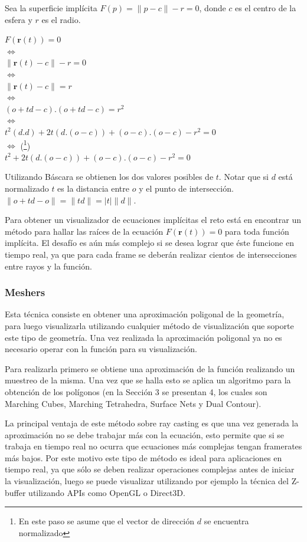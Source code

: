 \documentclass[12pt]{article}
\begin{document}
Sea la superficie implícita $F(p)=\lVert p -c \rVert - r = 0$, donde $c$ es el centro de la esfera y $r$ es el radio.
\begin{center}
$ F(\textbf{r}(t))= 0$
\\$ \iff$
\\$ \lVert \textbf{r}(t) -c \rVert - r = 0$
\\$ \iff$
\\$ \lVert \textbf{r}(t) -c \rVert = r$
\\ $\iff$
\\ $(o+td -c).(o+td -c) = r^2 $ 
\\ $\iff$
\\$t^2(d.d) + 2t(d.(o-c)) + (o-c).(o-c) - r^2=0$
\\ $\iff$ (\footnote{En este paso se asume que el vector de dirección $d$ se encuentra normalizado})
\\$t^2 + 2t(d.(o-c)) + (o-c).(o-c) - r^2=0$
\end{center}

Utilizando Báscara se obtienen los dos valores posibles de $t$. Notar que si $d$ está normalizado $t$ es la distancia entre $o$ y el punto de intersección. $\lVert o + td - o \rVert = \lVert td\rVert = |t|\lVert d \rVert$.

Para obtener un visualizador de ecuaciones implícitas el reto está en encontrar un método para hallar las raíces de la ecuación $F(\textbf{r}(t))=0$ para toda función implícita. El desafío es aún más complejo si se desea lograr que éste funcione en tiempo real, ya que para cada frame se deberán realizar cientos de intersecciones entre rayos y la función.  
\subsubsection{Meshers}
\noindent Esta técnica consiste en obtener una aproximación poligonal de la geometría, para luego visualizarla utilizando cualquier método de visualización que soporte este tipo de geometría. Una vez realizada la aproximación poligonal ya no es necesario operar con la función para su visualización.

Para realizarla primero se obtiene una aproximación de la función realizando un muestreo de la misma. Una vez que se halla esto se aplica un algoritmo para la obtención de los polígonos (en la Sección 3 se presentan 4, los cuales son Marching Cubes, Marching Tetrahedra, Surface Nets y Dual Contour)\cite{mykola1}\cite{mykola2}.

La principal ventaja de este método sobre ray casting es que una vez generada la aproximación no se debe trabajar más con la ecuación, esto permite que si se trabaja en tiempo real no ocurra que ecuaciones más complejas tengan framerates más bajos. Por este motivo este tipo de método es ideal para aplicaciones en tiempo real, ya que sólo se deben realizar operaciones complejas antes de iniciar la visualización, luego se puede visualizar utilizando por ejemplo la técnica del Z-buffer utilizando APIs como OpenGL o Direct3D.
\end{document}
